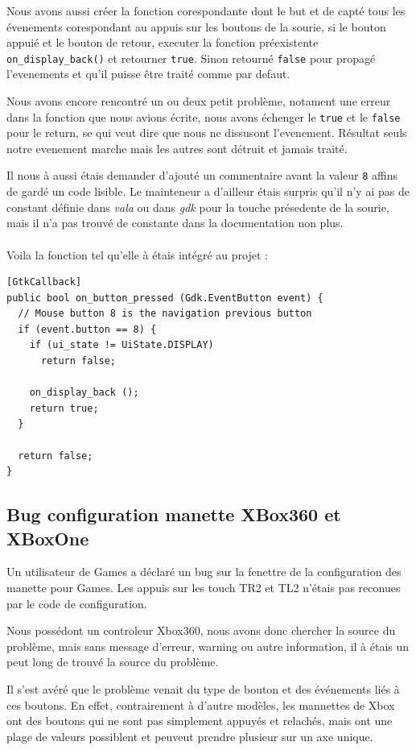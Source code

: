 \documentclass[12pt]{report}
\begin{document}
Nous avons aussi créer la fonction corespondante dont le but et de capté tous
les évenements corespondant au appuis sur les boutons de la sourie, si le
bouton appuié et le bouton de retour, executer la fonction préexistente
\texttt{on\_display\_back()} et retourner \texttt{true}.
Sinon retourné \texttt{false} pour propagé l'evenements et qu'il puisse être
traité comme par defaut.

Nous avons encore rencontré un ou deux petit problème, notament une erreur
dans la fonction que nous avions écrite, nous avons échenger le \texttt{true}
et le \texttt{false} pour le return, se qui veut dire que nous ne dissusont
l'evenement.
Résultat seuls notre evenement marche mais les autres sont détruit et jamais
traité.

Il nous à aussi étais demander d'ajouté un commentaire avant la valeur
\texttt{8} affins de gardé un code lisible. Le mainteneur a d'ailleur étais
surpris qu'il n'y ai pas de constant définie dans \textit{vala} ou dans
\textit{gdk} pour la touche présedente de la sourie, mais il n'a pas trouvé
de constante dans la documentation non plus. \\
\\
Voila la fonction tel qu'elle à étais intégré au projet :
\begin{verbatim}
[GtkCallback]
public bool on_button_pressed (Gdk.EventButton event) {
  // Mouse button 8 is the navigation previous button
  if (event.button == 8) {
    if (ui_state != UiState.DISPLAY)
      return false;

    on_display_back ();
    return true;
  }

  return false;
}
\end{verbatim}

\subsection{Bug configuration manette XBox360 et XBoxOne}
Un utilisateur de Games a déclaré un bug sur la fenettre de la configuration
des manette pour Games. Les appuis sur les touch TR2 et TL2 n'étais pas
reconues par le code de configuration.

Nous possédont un controleur Xbox360, nous avons donc chercher la source du
problème, mais sans message d'erreur, warning ou autre information, il à
étais un peut long de trouvé la source du problème.

Il s'est avéré que  le problème venait du type de bouton et des événements
liés à ces boutons. En effet, contrairement à d'autre modèles, les mannettes de
Xbox ont des boutons qui ne sont pas simplement appuyés et relachés, mais
ont une plage de valeurs possiblent et peuveut prendre plusieur sur un
axe unique.
\end{document}
